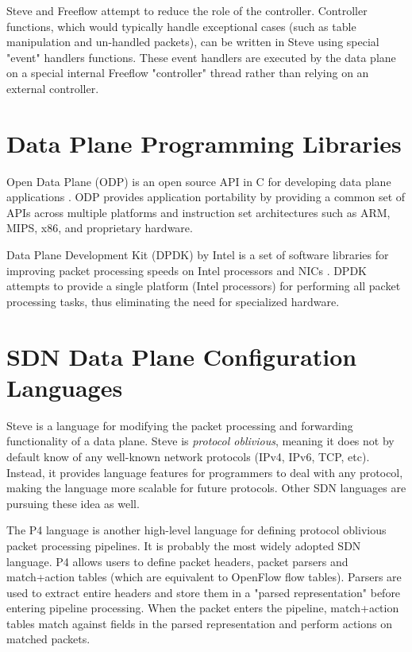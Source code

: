 Steve and Freeflow attempt to reduce the role of the controller. Controller
functions, which would typically handle exceptional cases (such as table
manipulation and un-handled packets), can be written in Steve using special
"event" handlers functions. These event handlers are executed by the data plane
on a special internal Freeflow "controller" thread rather than relying on an
external controller. 

\section{Data Plane Programming Libraries} \label{rel:dp_lib}

Open Data Plane (ODP) is an open source API in C for developing data plane applications \cite{odp_webpage}. ODP provides application portability by providing a common set of APIs across multiple platforms and instruction set architectures such as ARM, MIPS, x86, and proprietary hardware.

Data Plane Development Kit (DPDK) by Intel is a set of software libraries for improving packet processing speeds on Intel processors and NICs \cite{dpdk_webpage}. DPDK attempts to provide a single platform (Intel processors) for performing all packet processing tasks, thus eliminating the need for specialized hardware.

\section{SDN Data Plane Configuration Languages} \label{rel:p4}

Steve is a language for modifying the packet processing and forwarding functionality of a data plane. Steve is \textit{protocol oblivious}, meaning it does not by default
know of any well-known network protocols (IPv4, IPv6, TCP, etc). Instead, it
provides language features for programmers to deal with any protocol, making the
language more scalable for future protocols. Other SDN languages are pursuing
these idea as well.

The P4 language \cite{p4_spec, p4_spec2} is another high-level language for
defining protocol oblivious packet processing pipelines. It is probably the
most widely adopted SDN language. P4 allows users to define packet headers,
packet parsers and
match+action tables (which are equivalent to OpenFlow flow tables). Parsers are
used to extract entire headers and store them in a "parsed representation"
before entering pipeline processing. When the packet enters the pipeline,
match+action tables match against fields in the parsed representation and
perform actions on matched packets. 

